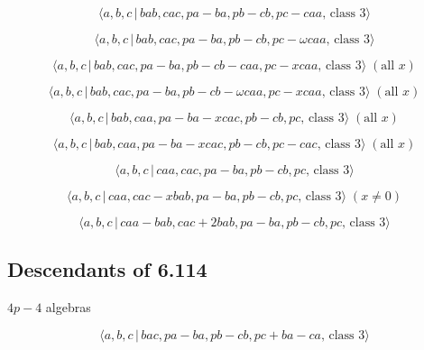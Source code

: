 \documentclass[10pt]{article}
\begin{document}
\begin{equation}
\langle a,b,c\,|\,bab,cac,pa-ba,pb-cb,pc-caa,\,\text{class }3\rangle 
\tag{7.1376}
\end{equation}

\begin{equation}
\langle a,b,c\,|\,bab,cac,pa-ba,pb-cb,pc-\omega caa,\,\text{class }3\rangle 
\tag{7.1377}
\end{equation}

\begin{equation}
\langle a,b,c\,|\,bab,cac,pa-ba,pb-cb-caa,pc-xcaa,\,\text{class }3\rangle \;(%
\text{all }x)  \tag{7.1378}
\end{equation}

\begin{equation}
\langle a,b,c\,|\,bab,cac,pa-ba,pb-cb-\omega caa,pc-xcaa,\,\text{class }%
3\rangle \;(\text{all }x)  \tag{7.1379}
\end{equation}

\begin{equation}
\langle a,b,c\,|\,bab,caa,pa-ba-xcac,pb-cb,pc,\,\text{class }3\rangle \;(%
\text{all }x)  \tag{7.1380}
\end{equation}

\begin{equation}
\langle a,b,c\,|\,bab,caa,pa-ba-xcac,pb-cb,pc-cac,\,\text{class }3\rangle \;(%
\text{all }x)  \tag{7.1381}
\end{equation}

\begin{equation}
\langle a,b,c\,|\,caa,cac,pa-ba,pb-cb,pc,\,\text{class }3\rangle 
\tag{7.1382}
\end{equation}

\begin{equation}
\langle a,b,c\,|\,caa,cac-xbab,pa-ba,pb-cb,pc,\,\text{class }3\rangle \;(x
\neq 0)  \tag{7.1383}
\end{equation}

\begin{equation}
\langle a,b,c\,|\,caa-bab,cac+2bab,pa-ba,pb-cb,pc,\,\text{class }3\rangle 
\tag{7.1384}
\end{equation}

\subsection{Descendants of 6.114}

$4p-4$ algebras

\begin{equation}
\langle a,b,c\,|\,bac,pa-ba,pb-cb,pc+ba-ca,\,\text{class }3\rangle 
\tag{7.1385}
\end{equation}
\end{document}
